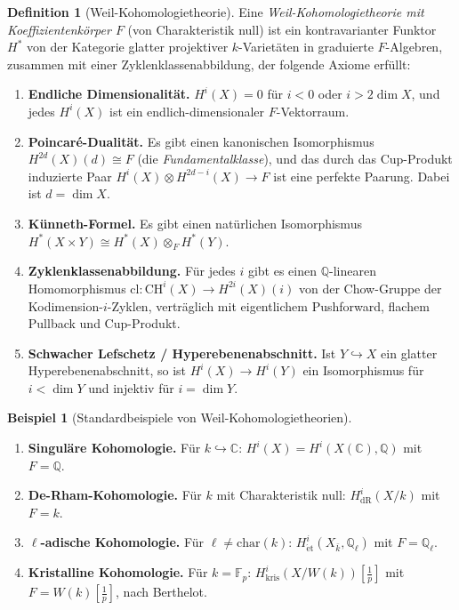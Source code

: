 \documentclass[12pt,a4paper]{amsart}
\theoremstyle{definition}
\newtheorem{example}[theorem]{Beispiel}
\newtheorem{definition_de}[theorem]{Definition}
\newcommand{\Q}{\mathbb{Q}}
\newcommand{\C}{\mathbb{C}}
\newcommand{\Fp}{\mathbb{F}_p}
\newcommand{\CH}{\mathrm{CH}}
\newcommand{\cl}{\mathrm{cl}}
\newcommand{\ch}{\mathrm{char}}
\begin{document}
\begin{definition_de}[Weil-Kohomologietheorie]
Eine \emph{Weil-Kohomologietheorie mit Koeffizientenkörper $F$} (von
Charakteristik null) ist ein kontravarianter Funktor $H^*$ von der
Kategorie glatter projektiver $k$-Varietäten in graduierte $F$-Algebren,
zusammen mit einer Zyklenklassenabbildung, der folgende Axiome erfüllt:
\begin{enumerate}[label=(\roman*)]
  \item \textbf{Endliche Dimensionalität.}  $H^i(X) = 0$ für $i < 0$ oder
        $i > 2\dim X$, und jedes $H^i(X)$ ist ein endlich-dimensionaler
        $F$-Vektorraum.
  \item \textbf{Poincaré-Dualität.}  Es gibt einen kanonischen Isomorphismus
        $H^{2d}(X)(d) \cong F$ (die \emph{Fundamentalklasse}), und das durch
        das Cup-Produkt induzierte Paar
        $H^i(X) \otimes H^{2d-i}(X) \to F$ ist eine perfekte Paarung.
        Dabei ist $d = \dim X$.
  \item \textbf{Künneth-Formel.}  Es gibt einen natürlichen Isomorphismus
        $H^*(X \times Y) \cong H^*(X) \otimes_F H^*(Y)$.
  \item \textbf{Zyklenklassenabbildung.}  Für jedes $i$ gibt es einen
        $\Q$-linearen Homomorphismus
        $\cl: \CH^i(X) \to H^{2i}(X)(i)$
        von der Chow-Gruppe der Kodimension-$i$-Zyklen, verträglich mit
        eigentlichem Pushforward, flachem Pullback und Cup-Produkt.
  \item \textbf{Schwacher Lefschetz / Hyperebenenabschnitt.}  Ist
        $Y \hookrightarrow X$ ein glatter Hyperebenenabschnitt, so ist
        $H^i(X) \to H^i(Y)$ ein Isomorphismus für $i < \dim Y$ und
        injektiv für $i = \dim Y$.
\end{enumerate}
\end{definition_de}

\begin{example}[Standardbeispiele von Weil-Kohomologietheorien]
\begin{enumerate}[label=(\alph*)]
  \item \textbf{Singuläre Kohomologie.}  Für $k \hookrightarrow \C$:
        $H^i(X) = H^i(X(\C),\Q)$ mit $F = \Q$.
  \item \textbf{De-Rham-Kohomologie.}  Für $k$ mit Charakteristik null:
        $H^i_{\mathrm{dR}}(X/k)$ mit $F = k$.
  \item \textbf{$\ell$-adische Kohomologie.}  Für $\ell \neq \ch(k)$:
        $H^i_{\mathrm{\acute{e}t}}(X_{\bar k}, \Q_\ell)$ mit $F = \Q_\ell$.
  \item \textbf{Kristalline Kohomologie.}  Für $k = \Fp$:
        $H^i_{\mathrm{kris}}(X/W(k))[\frac{1}{p}]$ mit $F = W(k)[\frac{1}{p}]$,
        nach Berthelot.
\end{enumerate}
\end{example}
\end{document}

